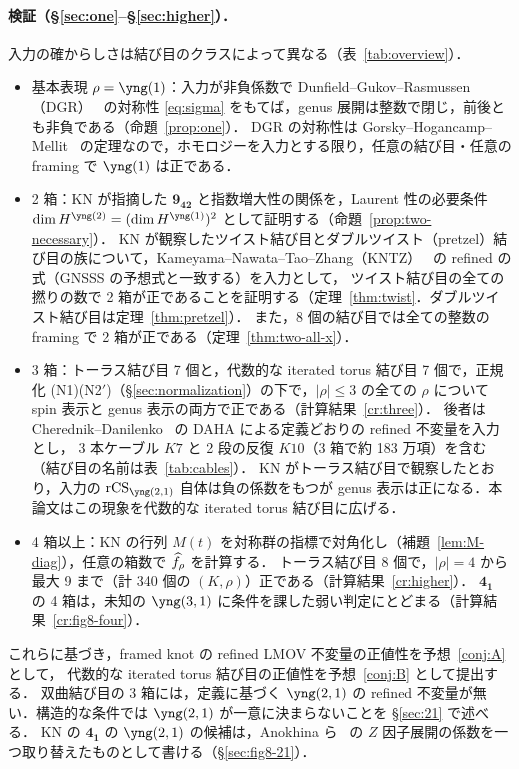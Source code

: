 \paragraph{検証（\S\ref{sec:one}--\S\ref{sec:higher}）．}
入力の確からしさは結び目のクラスによって異なる（表~\ref{tab:overview}）．
\begin{itemize}
\item 基本表現 $\rho=\yng(1)$：入力が非負係数で Dunfield--Gukov--Rasmussen（DGR）~\cite{Dunfield05} の対称性 \eqref{eq:sigma} をもてば，genus 展開は整数で閉じ，前後とも非負である（命題~\ref{prop:one}）．
DGR の対称性は Gorsky--Hogancamp--Mellit~\cite{Gorsky21} の定理なので，ホモロジーを入力とする限り，任意の結び目・任意の framing で $\yng(1)$ は正である．
\item 2 箱：KN が指摘した $\mathbf{9_{42}}$ と指数増大性の関係を，Laurent 性の必要条件 $\dim H^{\yng(2)}=(\dim H^{\yng(1)})^2$ として証明する（命題~\ref{prop:two-necessary}）．
KN が観察したツイスト結び目とダブルツイスト（pretzel）結び目の族について，Kameyama--Nawata--Tao--Zhang（KNTZ）~\cite{Kameyama19} の refined の式（GNSSS の予想式と一致する）を入力として，
ツイスト結び目の全ての撚りの数で 2 箱が正であることを証明する（定理~\ref{thm:twist}．ダブルツイスト結び目は定理~\ref{thm:pretzel}）．
また，8 個の結び目では全ての整数の framing で 2 箱が正である（定理~\ref{thm:two-all-x}）．
\item 3 箱：トーラス結び目 7 個と，代数的な iterated torus 結び目 7 個で，正規化 (N1)(N2$'$)（\S\ref{sec:normalization}）の下で，$|\rho|\le3$ の全ての $\rho$ について spin 表示と genus 表示の両方で正である（計算結果~\ref{cr:three}）．
後者は Cherednik--Danilenko~\cite{Cherednik14} の DAHA による定義どおりの refined 不変量を入力とし，
3 本ケーブル $K7$ と 2 段の反復 $K10$（3 箱で約 183 万項）を含む（結び目の名前は表~\ref{tab:cables}）．
KN がトーラス結び目で観察したとおり，入力の $\rCS_{\yng(2,1)}$ 自体は負の係数をもつが genus 表示は正になる．本論文はこの現象を代数的な iterated torus 結び目に広げる．
\item 4 箱以上：KN の行列 $M(t)$ を対称群の指標で対角化し（補題~\ref{lem:M-diag}），任意の箱数で $\widehat{f}_\rho$ を計算する．
トーラス結び目 8 個で，$|\rho|=4$ から最大 9 まで（計 340 個の $(K,\rho)$）正である（計算結果~\ref{cr:higher}）．
$\mathbf{4_1}$ の 4 箱は，未知の $\yng(3,1)$ に条件を課した弱い判定にとどまる（計算結果~\ref{cr:fig8-four}）．
\end{itemize}
これらに基づき，framed knot の refined LMOV 不変量の正値性を予想~\ref{conj:A} として，
代数的な iterated torus 結び目の正値性を予想~\ref{conj:B} として提出する．
双曲結び目の 3 箱には，定義に基づく $\yng(2,1)$ の refined 不変量が無い．構造的な条件では $\yng(2,1)$ が一意に決まらないことを \S\ref{sec:21} で述べる．
KN の $\mathbf{4_1}$ の $\yng(2,1)$ の候補は，Anokhina ら~\cite{Anokhina12} の $Z$ 因子展開の係数を一つ取り替えたものとして書ける（\S\ref{sec:fig8-21}）．

